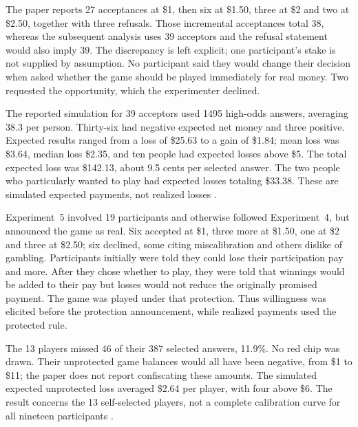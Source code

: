 The paper reports 27 acceptances at \$1, then six at \$1.50, three at
\$2 and two at \$2.50, together with three refusals. Those incremental
acceptances total 38, whereas the subsequent analysis uses 39 acceptors
and the refusal statement would also imply 39. The discrepancy is left
explicit; one participant's stake is not supplied by assumption.
No participant said they would change their decision when asked whether
the game should be played immediately for real money. Two requested the
opportunity, which the experimenter declined.

The reported simulation for 39 acceptors used 1495 high-odds answers,
averaging 38.3 per person. Thirty-six had negative expected net money and
three positive. Expected results ranged from a loss of \$25.63 to a gain
of \$1.84; mean loss was \$3.64, median loss \$2.35, and ten people
had expected losses above \$5. The total expected loss was \$142.13,
about 9.5 cents per selected answer. The two people who particularly
wanted to play had expected losses totaling \$33.38. These are simulated
expected payments, not realized losses
\cite[pp.~558--559]{FischhoffSlovicLichtenstein1977Certainty}.

Experiment~5 involved 19 participants and otherwise followed Experiment~4,
but announced the game as real. Six accepted at \$1, three more at
\$1.50, one at \$2 and three at \$2.50; six declined, some citing
miscalibration and others dislike of gambling. Participants initially were
told they could lose their participation pay and more. After they chose
whether to play, they were told that winnings would be added to their pay
but losses would not reduce the originally promised payment. The game was
played under that protection. Thus willingness was elicited before the
protection announcement, while realized payments used the protected rule.

The 13 players missed 46 of their 387 selected answers, 11.9\%. No red
chip was drawn. Their unprotected game balances would all have been negative,
from \$1 to \$11; the paper does not report confiscating these amounts.
The simulated expected unprotected loss averaged \$2.64 per player, with
four above \$6. The result concerns the 13 self-selected players, not a
complete calibration curve for all nineteen participants
\cite[p.~559]{FischhoffSlovicLichtenstein1977Certainty}.

